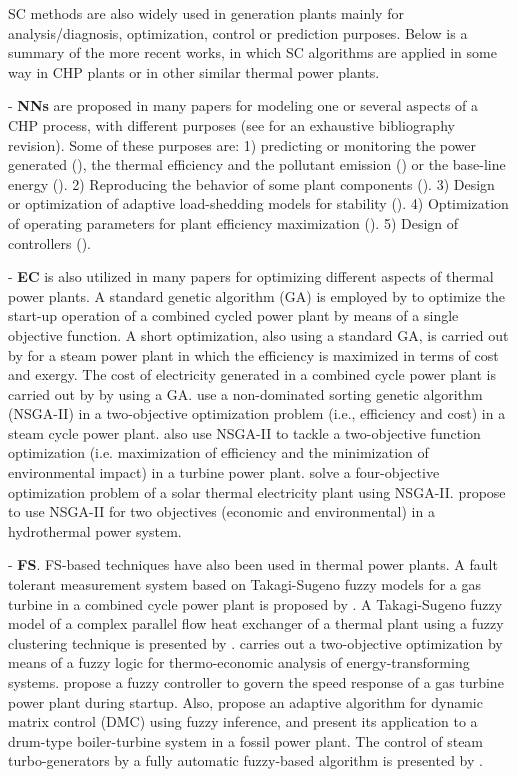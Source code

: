 SC methods are also widely used in generation plants mainly for analysis/diagnosis, optimization, control or prediction purposes. Below is a summary of the more recent works, in which SC algorithms are applied in some way in CHP plants or in other similar thermal power plants.

- \textbf{NNs} are proposed in many papers for modeling one or several aspects of a CHP process, with different purposes  (see \cite{Rossi-2014} for an exhaustive bibliography revision). Some of these purposes are: 1) predicting or monitoring the power generated (\cite{De-2007,Smrekar-2010,Nikpey-2013,Sisworahardjo-2013}), the thermal efficiency and the pollutant emission (\cite{Flynn-2005,Pan-2007}) or the base-line energy (\cite{Rossi-2014}). 2) Reproducing the behavior of some plant components (\cite{Bekat-2012}). 3) Design or optimization of adaptive load-shedding models for stability (\cite{Kumar-2013}). 4) Optimization of operating parameters for plant efficiency maximization (\cite{Zomo-2011,Arslam-2011}). 5) Design of controllers (\cite{Wang-2008,Lee-2010}).

- \textbf{EC} is also utilized in many papers for optimizing different aspects of thermal power plants. A standard genetic algorithm (GA) is employed by \cite{Bertini-12} to optimize the start-up operation of a combined cycled power plant by means of a single objective function. A short optimization, also using a standard GA, is carried out by \cite{Ameri-09} for a steam power plant in which the efficiency is maximized in terms of cost and exergy. The cost of electricity generated in a combined cycle power plant is carried out by \cite{Koch-2007} by using a GA. \cite{Haja-2012} use a non-dominated sorting genetic algorithm (NSGA-II) in a two-objective optimization problem (i.e., efficiency and cost) in a steam cycle power plant. \cite{Ahmadi-2011} also use NSGA-II to tackle a two-objective function optimization (i.e. maximization of efficiency and the minimization of environmental impact) in a turbine power plant. \cite{Deb2012} solve a four-objective optimization problem of a solar thermal electricity plant using NSGA-II. \cite{Basu-11} propose to use NSGA-II for two objectives (economic and environmental) in a hydrothermal power system. 

- \textbf{FS}. FS-based techniques have also been used in thermal power plants. A fault tolerant measurement system based on Takagi-Sugeno fuzzy models for a gas turbine in a combined cycle power plant is proposed by \cite{Berrios-2011}. A Takagi-Sugeno fuzzy model of a complex parallel flow heat exchanger of a thermal plant using a fuzzy clustering technique is presented by \cite{Habi-2011}. \cite{Mazur-2009} carries out a two-objective optimization by means of a fuzzy logic for thermo-economic analysis of energy-transforming systems. \cite{Rodriguez-Martinez-2011} propose a fuzzy controller to govern the speed response of a gas turbine power plant during startup. Also, \cite{Moon-2011} propose an adaptive algorithm for dynamic matrix control (DMC) using fuzzy inference, and present its application to a drum-type boiler-turbine system in a fossil power plant. The control of steam turbo-generators by a fully automatic fuzzy-based algorithm is presented by \cite{Gunes-2010}.

